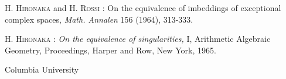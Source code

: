 \begin{thebibliography}{99}
 \textsc{H. Hironaka} and \textsc{H. Rossi :} On the equivalence of imbeddings of exceptional complex spaces, {\em Math. Annalen} 156 (1964), 313-333.

 \textsc{H. Hironaka :} {\em On the equivalence of singularities,} I, Arithmetic Algebraic Geometry, Proceedings, Harper and Row, New York, 1965.
\end{thebibliography}

\bigskip
\noindent
{\small Columbia University}
